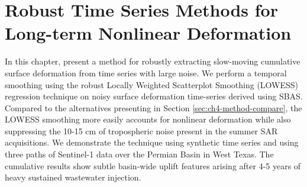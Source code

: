 %



\chapter{Robust Time Series Methods for Long-term Nonlinear Deformation}
\label{CHAP:5-robust-ts}


In this chapter, present a method for robustly extracting slow-moving cumulative surface deformation from time series with large noise. 
We perform a temporal smoothing using the robust Locally Weighted Scatterplot Smoothing (LOWESS) regression technique \cite{Cleveland1979RobustLocallyWeighted} on noisy surface deformation time-series derived using SBAS.
Compared to the alternatives presenting in Section \ref{sec:ch4-method-compare}, the LOWESS smoothing more easily accounts for nonlinear deformation while also suppressing the 10-15 cm of tropospheric noise present in the summer SAR acquisitions. 
We demonstrate the technique using synthetic time series and using three paths of Sentinel-1 data over the Permian Basin in West Texas. 
The cumulative results show subtle basin-wide uplift features arising after 4-5 years of heavy sustained wastewater injection.



%	

